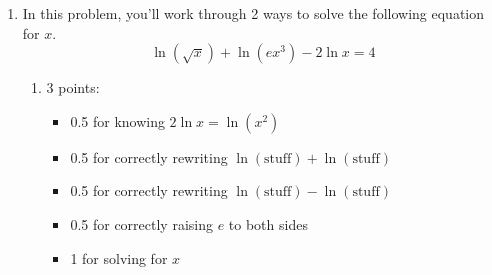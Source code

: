 \documentclass{article}
\begin{document}
\begin{enumerate}
\begin{enumerate}
    \begin{solution}
      We can rewrite the equation so that we have one term
      on each side and take the log base 5 of both sides.
      \begin{align*}
        5^{x^2} - \frac{25}{5^x} &= 0 \\
        5^{x^2} &= \frac{25}{5^x} \\
        \log_5(5^{x^2}) &= \log_5\!\left(\frac{25}{5^x}\right) \\
        \log_5(5^{x^2}) &= \log_5 25 - \log_5 (5^x) \\
        x^2 &= 2 - x \\
        x^2 +x - 2 &= 0 \\
        (x+2)(x-1) &= 0
      \end{align*}
      This gives us the solutions $x=-2$ and $x=1$. Plugging
      in $x=-2$, we see that it is a solution.
      \begin{align*}
        5^{(-2)^2} - \frac{25}{5^{-2}} &= 0 \\
        5^4 - 5^4 &= 0\ \text{\ding{51}} \\
        \intertext{Plugging in $x=1$, we see that it is
        also a solution.}
        5^{1^2} - \frac{25}{5^1} &= 0\\
        5 - 5 &= 0 \ \text{\ding{51}}
      \end{align*}
      So the two solutions are $x=\boxed{-2}$ and $x=\boxed{1}$.
    \end{solution}

  \end{enumerate}

\item  In this problem, you'll work through 2 ways to solve the following equation  for $x$.
  \[ \ln \left( \sqrt{x} \right) + \ln \left( ex^3 \right) - 2\ln x = 4\]

  \begin{enumerate}

  \item

    \begin{grading}
      3 points:
      \begin{itemize}[nosep]
      \item 0.5 for knowing $2 \ln x = \ln \left( x^2 \right)$
      \item 0.5 for correctly rewriting $\ln(\text{stuff}) + \ln(\text{stuff})$
      \item 0.5 for correctly rewriting $\ln(\text{stuff}) - \ln(\text{stuff})$
      \item 0.5 for correctly raising $e$ to both sides
      \item 1 for solving for $x$
      \end{itemize}
    \end{grading}


\end{enumerate}
\end{enumerate}
\end{document}
